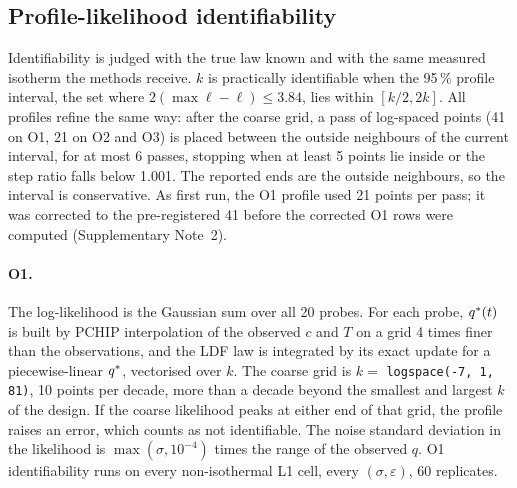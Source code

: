 \subsection*{Profile-likelihood identifiability}
Identifiability is judged with the true law known and with the same measured isotherm the
methods receive. $k$ is practically identifiable when the 95\,\% profile interval, the set
where $2(\max\ell - \ell) \le 3.84$, lies within $[k/2, 2k]$. All profiles refine the same
way: after the coarse grid, a pass of log-spaced points (41 on O1, 21 on O2 and O3) is placed
between the outside neighbours of the current interval, for at most 6 passes, stopping when at
least 5 points lie inside or the step ratio falls below 1.001. The reported ends are the outside
neighbours, so the interval is conservative. As first run, the O1 profile used 21 points per
pass; it was corrected to the pre-registered 41 before the corrected O1 rows were computed
(Supplementary Note~2).

\paragraph{O1.} The log-likelihood is the Gaussian sum over all 20 probes. For each probe,
$q^{*}(t)$ is built by PCHIP interpolation of the observed $c$ and $T$ on a grid 4 times finer
than the observations, and the LDF law is integrated by its exact update for a piecewise-linear
$q^{*}$, vectorised over $k$. The coarse grid is $k = $ \texttt{logspace(-7, 1, 81)}, 10 points
per decade, more than a decade beyond the smallest and largest $k$ of the design. If the
coarse likelihood peaks at either end of that grid, the profile raises an error, which counts
as not identifiable. The noise standard deviation in the likelihood is
$\max(\sigma, 10^{-4})$ times the range of the observed $q$. O1 identifiability runs on every
non-isothermal L1 cell, every $(\sigma, \varepsilon)$, 60 replicates.

